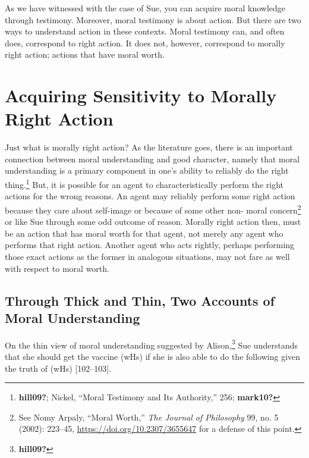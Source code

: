 \documentclass[phdthesis,12pt,final]{wuthesis}
\theoremstyle{definition}
\theoremstyle{definition}
\theoremstyle{definition}
\theoremstyle{definition}
\theoremstyle{remark}
\begin{document}
As we have witnessed with the case of Sue, you can acquire moral knowledge through testimony. Moreover, moral testimony is about action. But there are two ways to understand action in these contexts. Moral testimony can, and often does, correspond to right action. It does not, however, correspond to morally right action; actions that have moral worth.

\section{Acquiring Sensitivity to Morally Right Action}\label{acquiring-sensitivity-to-morally-right-action}

Just what is morally right action? As the literature goes, there is an important connection between moral understanding and good character, namely that moral understanding is a primary component in one's ability to reliably do the right thing.\footnote{\textbf{hill09?}; Nickel, {``Moral {Testimony} and Its {Authority},''} 256; \textbf{mark10?}} But, it is possible for an agent to characteristically perform the right actions for the wrong reasons. An agent may reliably perform some right action because they care about self-image or because of some other non- moral concern\footnote{See Nomy Arpaly, {``Moral {Worth},''} \emph{The Journal of Philosophy} 99, no. 5 (2002): 223--45, \url{https://doi.org/10.2307/3655647} for a defense of this point.} or like Sue through some odd outcome of reason. Morally right action then, must be an action that has moral worth for that agent, not merely any agent who performs that right action. Another agent who acts rightly, perhaps performing those exact actions as the former in analogous situations, may not fare as well with respect to moral worth.

\subsection*{Through Thick and Thin, Two Accounts of Moral Understanding}\label{through-thick-and-thin-two-accounts-of-moral-understanding}

On the thin view of moral understanding suggested by Alison,\footnote{\textbf{hill09?}} Sue understands that she should get the vaccine (wHs) if she is also able to do the following given the truth of (wHs) {[}102--103{]}.

\begin{Shaded}
\begin{Highlighting}[]

\end{Highlighting}
\end{Shaded}
\end{document}
